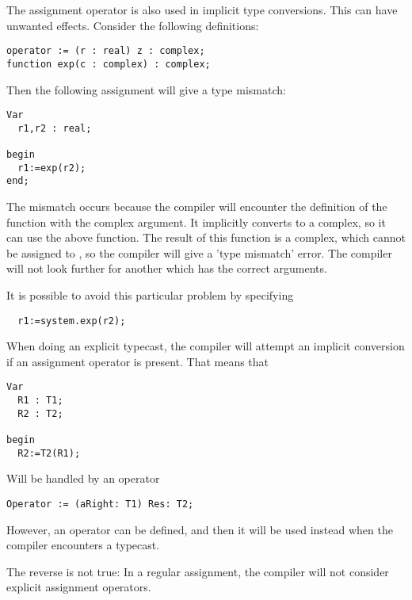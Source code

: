 \begin{remark}
The assignment operator is also used in implicit type conversions. This can
have unwanted effects. Consider the following definitions:
\begin{verbatim}
operator := (r : real) z : complex;
function exp(c : complex) : complex;
\end{verbatim}
Then the following assignment will give a type mismatch:
\begin{verbatim}
Var
  r1,r2 : real;

begin
  r1:=exp(r2);
end;
\end{verbatim}
The mismatch occurs because the compiler will encounter the definition of the  function
with the complex argument. It implicitly converts  to a complex, so it can
use the above  function. The result of this function is a complex,
which cannot be assigned to , so the compiler will give a 'type mismatch'
error. The compiler will not look further for another  which has
the correct arguments.

It is possible to avoid this particular problem by specifying
\begin{verbatim}
  r1:=system.exp(r2);
\end{verbatim}
\end{remark}

When doing an explicit typecast, the compiler will attempt an implicit conversion
if an assignment operator is present. That means that
\begin{verbatim}
Var
  R1 : T1;
  R2 : T2;

begin
  R2:=T2(R1); 
\end{verbatim}
Will be handled by an operator
\begin{verbatim}
Operator := (aRight: T1) Res: T2;
\end{verbatim}
However, an  operator can be defined, and then it will be
used instead when the compiler encounters a typecast.

The reverse is not true: In a regular assignment, the compiler will not
consider explicit assignment operators.

